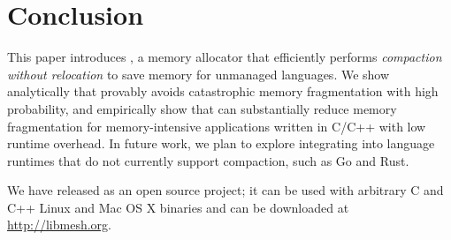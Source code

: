 \section{Conclusion}
\label{sec:conclusion}

This paper introduces \Mesh{}, a memory allocator that efficiently
performs \textit{compaction without relocation} to save memory for
unmanaged languages.  We show analytically that \Mesh{} provably
avoids catastrophic memory fragmentation with high probability, and
empirically show that \Mesh{} can substantially reduce memory
fragmentation for memory-intensive applications written in C/C++ with
low runtime overhead. In future work, we plan to
explore integrating \Mesh{} into language runtimes that do not
currently support compaction, such as Go and Rust.

We have released \Mesh as an open source
project; it can be used with arbitrary C and C++ Linux and Mac OS X
binaries and can be downloaded at
\url{http://libmesh.org}.
